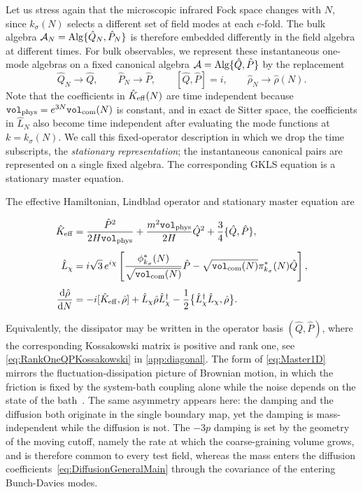\documentclass{article}
\newcommand{\VF}{\mathtt{vol}_{\rm com}}
\newcommand{\Vphys}{\mathtt{vol}_{\rm phys}}
\numberwithin{equation}{section}
\begin{document}
	Let us stress again that the microscopic infrared Fock space changes with \(N\), since \(k_\sigma(N)\) selects a different set of field modes at each $e$-fold. The bulk algebra \(\mathcal A_N={\rm Alg}\{\hat Q_N,\hat P_N\}\) is therefore embedded differently in the field algebra at different times. For bulk observables, we represent these instantaneous one-mode algebras on a fixed canonical algebra \(\mathcal A={\rm Alg}\{\hat Q,\hat P\}\) by the replacement
	\begin{equation}
		\hat Q_N\to\hat Q, \qquad \hat P_N\to\hat P, \qquad [\hat Q,\hat P]=i, \qquad \hat\rho_N\to\hat\rho(N).
	\end{equation}
	Note that the coefficients in \(\hat K_{\rm eff}(N)\) are time independent because \(\Vphys=e^{3N}\VF(N)\) is constant, and in exact de Sitter space, the coefficients in \(\hat L_N\) also become time independent after evaluating the mode functions at \(k=k_\sigma(N)\). We call this fixed-operator description in which we drop the time subscripts, the \textit{stationary representation}; the instantaneous canonical pairs are represented on a single fixed algebra. The corresponding GKLS equation is a stationary master equation.

	The effective Hamiltonian, Lindblad operator and stationary master equation are
	\begin{tcolorbox}[colback=white,colframe=black,arc=0pt,outer arc=0pt]
		\vspace{-10pt}
		\begin{align}
			\hat K_{\rm eff} &= \frac{\hat P^{2}}{2H\Vphys} + \frac{m^2\Vphys}{2H}\hat Q^2 + \frac34\{\hat Q,\hat P\},
			\label{eq:KeffStationaryMain}
			\\[4pt] \hat L_{\chi} &= i\sqrt3\,e^{i\chi}\left[ \frac{\phi_{k_\sigma}^*(N)}{\sqrt{\VF(N)}}\hat P - \sqrt{\VF(N)}\pi_{k_\sigma}^*(N)\hat Q \right],
			\label{eq:LindbladTimeIndep}
			\\[4pt] \frac{\dd\hat\rho}{\dd N} &= -i[\hat K_{\rm eff},\hat\rho] + \hat L_\chi\hat\rho\hat L_\chi^\dagger - \frac12 \bigl\{ \hat L_\chi^\dagger\hat L_\chi,\hat\rho \bigr\} .
			\label{eq:Master1D}
		\end{align}
	\end{tcolorbox}
	Equivalently, the dissipator may be written in the operator basis \((\hat Q,\hat P)\), where the corresponding Kossakowski matrix is positive and rank one, see \cref{eq:RankOneQPKossakowski} in \cref{app:diagonal}. The form of \cref{eq:Master1D} mirrors the fluctuation-dissipation picture of Brownian motion, in which the friction is fixed by the system-bath coupling alone while the noise depends on the state of the bath~\cite{caldeira1983path,petruccione}. The same asymmetry appears here: the damping and the diffusion both originate in the single boundary map, yet the damping is mass-independent while the diffusion is not. The \(-3p\) damping is set by the geometry of the moving cutoff, namely the rate at which the coarse-graining volume grows, and is therefore common to every test field, whereas the mass enters the diffusion coefficients~\eqref{eq:DiffusionGeneralMain} through the covariance of the entering Bunch-Davies modes.
	
\end{document}
